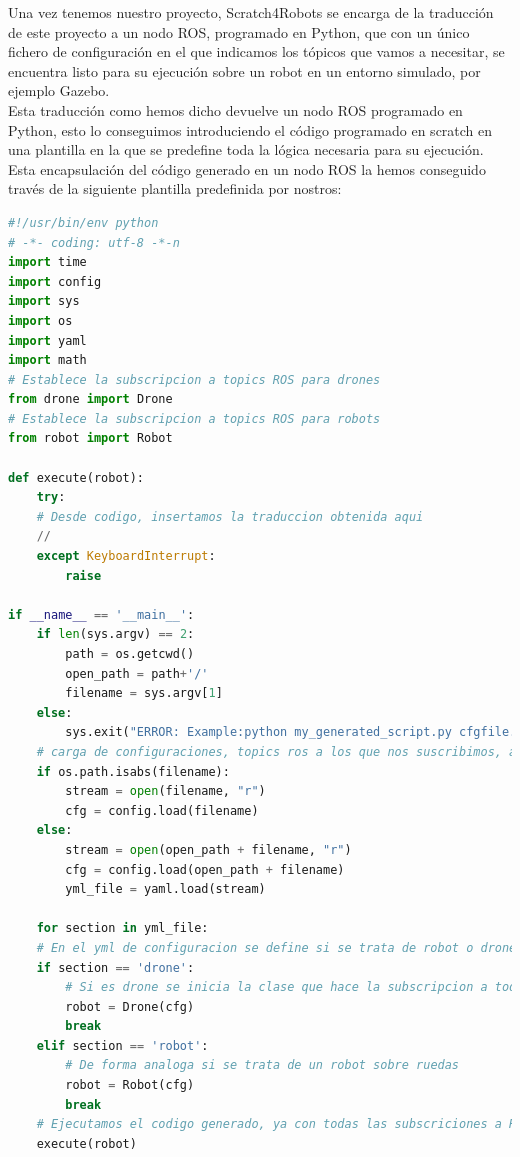 Una vez tenemos nuestro proyecto, Scratch4Robots se encarga de la traducción de este proyecto a un nodo ROS, programado en Python, que con un único fichero de configuración en el que indicamos los tópicos que vamos a necesitar, se encuentra listo para su ejecución sobre un robot en un entorno simulado, por ejemplo Gazebo.\\

Esta traducción como hemos dicho devuelve un nodo ROS programado en Python, esto lo conseguimos introduciendo el código programado en scratch en una plantilla en la que se predefine toda la lógica necesaria para su ejecución.\\

Esta encapsulación del código generado en un nodo ROS la hemos conseguido través de la siguiente plantilla predefinida por nostros:

\begin{lstlisting}[language=python,firstnumber=1]
#!/usr/bin/env python
# -*- coding: utf-8 -*-n
import time
import config
import sys
import os
import yaml
import math
# Establece la subscripcion a topics ROS para drones
from drone import Drone 
# Establece la subscripcion a topics ROS para robots
from robot import Robot 

def execute(robot):
    try:
    # Desde codigo, insertamos la traduccion obtenida aqui 
    //
    except KeyboardInterrupt:
        raise
        
if __name__ == '__main__':
    if len(sys.argv) == 2:
        path = os.getcwd()
        open_path = path+'/'
        filename = sys.argv[1]
    else:
        sys.exit("ERROR: Example:python my_generated_script.py cfgfile.yml")
    # carga de configuraciones, topics ros a los que nos suscribimos, a traves de fichero yml.
    if os.path.isabs(filename):
        stream = open(filename, "r")
        cfg = config.load(filename)
    else:
        stream = open(open_path + filename, "r")
        cfg = config.load(open_path + filename)
        yml_file = yaml.load(stream)
        
    for section in yml_file:
    # En el yml de configuracion se define si se trata de robot o drone.
    if section == 'drone':
        # Si es drone se inicia la clase que hace la subscripcion a todos los topics ROS
        robot = Drone(cfg)
    	break
    elif section == 'robot':
    	# De forma analoga si se trata de un robot sobre ruedas
        robot = Robot(cfg)
    	break
    # Ejecutamos el codigo generado, ya con todas las subscriciones a ROS hechas
    execute(robot)

\end{lstlisting}


